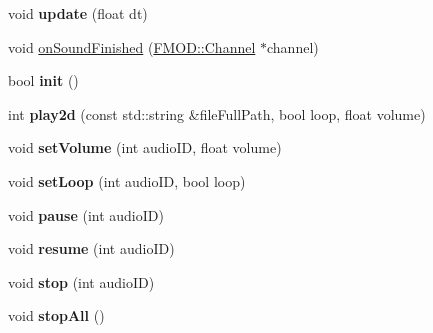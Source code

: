 \begin{DoxyCompactItemize}
void {\bfseries update} (float dt)
\item 
void \hyperlink{classexperimental_1_1AudioEngineImpl_a81a15f8396fd46cd51865b41ca9ac2ef}{on\+Sound\+Finished} (\hyperlink{classFMOD_1_1Channel}{F\+M\+O\+D\+::\+Channel} $\ast$channel)
\item 
\mbox{\label{classexperimental_1_1AudioEngineImpl_a908e5136201a8a6b53ae5c292329f82b}} 
bool {\bfseries init} ()
\item 
\mbox{\label{classexperimental_1_1AudioEngineImpl_a04b788a8319f5d7f90e297a2a345f745}} 
int {\bfseries play2d} (const std\+::string \&file\+Full\+Path, bool loop, float volume)
\item 
\mbox{\label{classexperimental_1_1AudioEngineImpl_aaa11ae7fe8bfd4c4365c02aa71f119b0}} 
void {\bfseries set\+Volume} (int audio\+ID, float volume)
\item 
\mbox{\label{classexperimental_1_1AudioEngineImpl_afd6600a03fa747d44c79f09fbc41b373}} 
void {\bfseries set\+Loop} (int audio\+ID, bool loop)
\item 
\mbox{\label{classexperimental_1_1AudioEngineImpl_a9c4026caed1c625774d3fd1e2114322a}} 
void {\bfseries pause} (int audio\+ID)
\item 
\mbox{\label{classexperimental_1_1AudioEngineImpl_ad180e0563cfb6944074a19304152d990}} 
void {\bfseries resume} (int audio\+ID)
\item 
\mbox{\label{classexperimental_1_1AudioEngineImpl_a56856900e92d2a4c19ea1a629bf19393}} 
void {\bfseries stop} (int audio\+ID)
\item 
\mbox{\label{classexperimental_1_1AudioEngineImpl_abcf87e42d6015ae5a0760ce815fb6f28}} 
void {\bfseries stop\+All} ()
\item 
\mbox{\label{classexperimental_1_1AudioEngineImpl_a12fa2f700f4d6e4effc72e1ad7e030cb}} 

\end{DoxyCompactItemize}
